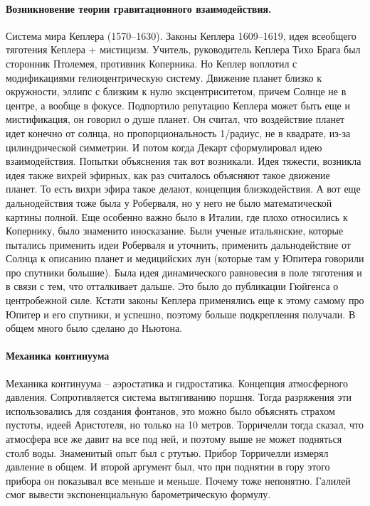 \documentclass[a4paper, 12pt]{article}
\begin{document}
\paragraph{Возникновение теории гравитационного взаимодействия.}
Система мира Кеплера (1570--1630). Законы Кеплера 1609--1619, идея 
всеобщего тяготения Кеплера + мистицизм. Учитель, руководитель Кеплера 
Тихо Брага был сторонник Птолемея, противник Коперника. Но Кеплер 
воплотил с модификациями гелиоцентрическую систему. Движение планет 
близко к окружности, эллипс с близким к нулю эксцентриситетом, причем 
Солнце не в центре, а вообще в фокусе. Подпортило репутацию Кеплера 
может быть еще и мистификация, он говорил о душе планет. Он считал, что 
воздействие планет идет конечно от солнца, но пропорциональность 
1/радиус, не в квадрате, из-за цилиндрической симметрии. И потом когда 
Декарт сформулировал идею взаимодействия. Попытки объяснения так вот 
возникали. Идея тяжести, возникла идея также вихрей эфирных, как раз 
считалось объясняют такое движение планет. То есть вихри эфира такое 
делают, концепция близкодействия. А вот еще дальнодействия тоже была 
у Роберваля, но у него не было математической картины полной. Еще 
особенно важно было в Италии, где плохо относились к Копернику,  было 
знаменито иносказание. Были ученые итальянские, которые пытались 
применить идеи Роберваля и уточнить, применить дальнодействие от Солнца 
к описанию планет и медицийских лун (которые там у Юпитера говорили про 
спутники большие). Была идея динамического равновесия в поле тяготения 
и в связи с тем, что отталкивает дальше. Это было до публикации Гюйгенса 
о центробежной силе. Кстати законы Кеплера применялись еще к этому 
самому про Юпитер и его спутники, и успешно, поэтому больше подкрепления 
получали. В общем много было сделано до Ньютона.

\paragraph{Механика континуума}
Механика континуума -- аэростатика и гидростатика. Концепция 
атмосферного давления. Сопротивляется система вытягиванию поршня. Тогда 
разряжения эти использовались для создания фонтанов, это можно было 
объяснять страхом пустоты, идеей Аристотеля, но только на 10 метров. 
Торричелли тогда сказал, что атмосфера все же давит на все под ней, 
и поэтому выше не может подняться столб воды. Знаменитый опыт был 
с ртутью. Прибор Торричелли измерял давление в общем. И второй аргумент 
был, что при поднятии в гору этого прибора он показывал все меньше 
и меньше. Почему тоже непонятно. Галилей смог вывести экспоненциальную 
барометрическую формулу.
\end{document}

